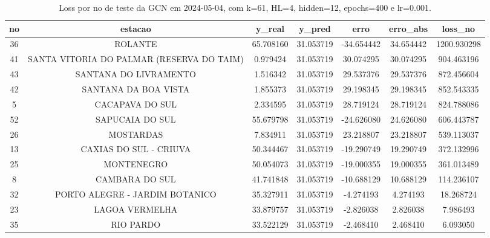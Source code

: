 \begin{table}[h]
\centering
\caption{Loss por no de teste da GCN em 2024-05-04, com k=61, HL=4, hidden=12, epochs=400 e lr=0.001.}
\label{tab:gcn_loss_k61_hl4_h12_e400_d20240504}
\begin{tabular}{ccccccc}
\toprule
no & estacao & y\_real & y\_pred & erro & erro\_abs & loss\_no \\
\midrule
36 & ROLANTE & 65.708160 & 31.053719 & -34.654442 & 34.654442 & 1200.930298 \\
41 & SANTA VITORIA DO PALMAR (RESERVA DO TAIM) & 0.979424 & 31.053719 & 30.074295 & 30.074295 & 904.463196 \\
43 & SANTANA DO LIVRAMENTO & 1.516342 & 31.053719 & 29.537376 & 29.537376 & 872.456604 \\
42 & SANTANA DA BOA VISTA & 1.855373 & 31.053719 & 29.198345 & 29.198345 & 852.543335 \\
5 & CACAPAVA DO SUL & 2.334595 & 31.053719 & 28.719124 & 28.719124 & 824.788086 \\
52 & SAPUCAIA DO SUL & 55.679798 & 31.053719 & -24.626080 & 24.626080 & 606.443787 \\
26 & MOSTARDAS & 7.834911 & 31.053719 & 23.218807 & 23.218807 & 539.113037 \\
13 & CAXIAS DO SUL - CRIUVA & 50.344467 & 31.053719 & -19.290749 & 19.290749 & 372.132996 \\
25 & MONTENEGRO & 50.054073 & 31.053719 & -19.000355 & 19.000355 & 361.013489 \\
8 & CAMBARA DO SUL & 41.741848 & 31.053719 & -10.688129 & 10.688129 & 114.236107 \\
32 & PORTO ALEGRE - JARDIM BOTANICO & 35.327911 & 31.053719 & -4.274193 & 4.274193 & 18.268724 \\
23 & LAGOA VERMELHA & 33.879757 & 31.053719 & -2.826038 & 2.826038 & 7.986493 \\
35 & RIO PARDO & 33.522129 & 31.053719 & -2.468410 & 2.468410 & 6.093050 \\
\bottomrule
\end{tabular}
\end{table}
